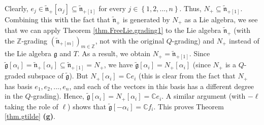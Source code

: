 \documentclass[etingof-lie.tex]{subfiles}
\begin{document}
\begin{vershort}
Clearly, $e_{j}\in\widetilde{\mathfrak{n}}_{+}\left[  \alpha_{j}\right]
\subseteq\widetilde{\mathfrak{n}}_{+\left[  1\right]  }$ for every
$j\in\left\{  1,2,...,n\right\}  $. Thus, $N_{+}\subseteq
\widetilde{\mathfrak{n}}_{+\left[  1\right]  }$. Combining this with the fact
that $\widetilde{\mathfrak{n}}_{+}$ is generated by $N_{+}$ as a Lie algebra,
we see that we can apply Theorem \ref{thm.FreeLie.grading1} to the Lie algebra
$\widetilde{\mathfrak{n}}_{+}$ (with the $\mathbb{Z}$-grading $\left(
\widetilde{\mathfrak{n}}_{+\left[  m\right]  }\right)  _{m\in\mathbb{Z}}$, not
with the original $Q$-grading) and $N_{+}$ instead of the Lie algebra
$\mathfrak{g}$ and $T$. As a result, we obtain $N_{+}=\widetilde{\mathfrak{n}%
}_{+\left[  1\right]  }$. Since $\widetilde{\mathfrak{g}}\left[  \alpha
_{i}\right]  =\widetilde{\mathfrak{n}}_{+}\left[  \alpha_{i}\right]
\subseteq\widetilde{\mathfrak{n}}_{+\left[  1\right]  }=N_{+}$, we have
$\widetilde{\mathfrak{g}}\left[  \alpha_{i}\right]  =N_{+}\left[  \alpha
_{i}\right]  $ (since $N_{+}$ is a $Q$-graded subspace of
$\widetilde{\mathfrak{g}}$). But $N_{+}\left[  \alpha_{i}\right]
=\mathbb{C}e_{i}$ (this is clear from the fact that $N_{+}$ has basis
$e_{1},e_{2},...,e_{n}$, and each of the vectors in this basis has a different
degree in the $Q$-grading). Hence, $\widetilde{\mathfrak{g}}\left[  \alpha
_{i}\right]  =N_{+}\left[  \alpha_{i}\right]  =\mathbb{C}e_{i}$. A similar
argument (with $-\ell$ taking the role of $\ell$) shows that
$\widetilde{\mathfrak{g}}\left[  -\alpha_{i}\right]  =\mathbb{C}f_{i}$. This
proves Theorem \ref{thm.gtilde} \textbf{(g)}.
\end{vershort}
\end{document}
